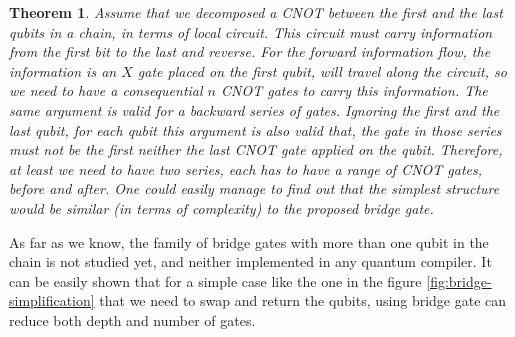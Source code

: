 \documentclass{report}
\newtheorem{theorem}{Theorem}
\begin{document}
\begin{theorem}
  Assume that we decomposed a CNOT between the first and the last qubits in a chain, in terms of local circuit.
  This circuit must carry information from the first bit to the last and reverse.
  For the forward information flow, the information is an $X$ gate placed on the first qubit, will travel along the circuit, so we need to have a consequential $n$ CNOT gates to carry this information. The same argument is valid for a backward series of gates.
  Ignoring the first and the last qubit, for each qubit this argument is also valid that, the gate in those series must not be the first neither the last CNOT gate applied on the qubit.
  Therefore, at least we need to have two series, each has to have a range of CNOT gates, before and after.
  One could easily manage to find out that the simplest structure would be similar (in terms of complexity) to the proposed bridge gate.
\end{theorem}


As far as we know, the family of bridge gates with more than one qubit in the chain is not studied yet, and neither implemented in any quantum compiler. 
It can be easily shown that for a simple case like the one in the figure \ref{fig:bridge-simplification} that we need to swap and return the qubits, using bridge gate can reduce both depth and number of gates. 
\end{document}
